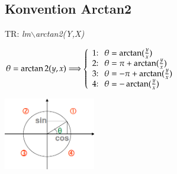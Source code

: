 \subsection{Konvention Arctan2 }
TR: \textit{lm$\backslash$arctan2(Y,X)}

	\begin{minipage}{10cm}
    	$\theta=\arctan2(y,x)\Longrightarrow\left\{
    	\begin{array}{l}
            \text{1:\space\space}\theta=\arctan(\frac{y}{x})\\
			\text{2:\space\space}\theta=\pi+\arctan(\frac{y}{x})\\
			\text{3:\space\space}\theta=-\pi+\arctan(\frac{y}{x})\\
			\text{4:\space\space}\theta=-\arctan(\frac{y}{x})\\
		\end{array}\right.$
    \end{minipage}
	\begin{minipage}{10cm}
    \includegraphics[width=4cm]{./bilder/einheitskreis.png}
    \end{minipage}

